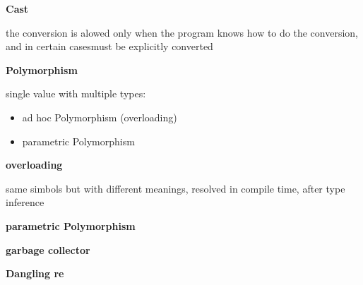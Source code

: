 \documentclass[12pt, a4paper]{article}
\begin{document}
\textbf{Cast}
    
the conversion is alowed only when the program knows how to do the conversion, and in certain 
casesmust be explicitly converted

\textbf{Polymorphism}

single value with multiple types:
\begin{itemize}
    \item ad hoc Polymorphism (overloading)
    \item parametric Polymorphism
\end{itemize}

\textbf{overloading}

same simbols but with different meanings, resolved in compile time, after type inference

\textbf{parametric Polymorphism}

\textbf{garbage collector}

\textbf{Dangling re}
\end{document}
